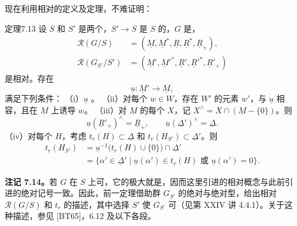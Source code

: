 现在利用相对的定义及定理，不难证明：
\begin{SGAresult}{定理}{7.13}
设 $S$ 和 $S'$ 是两个，$S'\to S$ 是 $S$ 的，$G$ 是，
\begin{align*}
 \mathscr R(G/S)&=(\underline M,\underline M^*,\underline R,\underline R^*,\underline R_+),\\
 \mathscr R(G_{S'}/S')&=(\underline M',\underline M'^*,\underline R',\underline R'^*,\underline R'_+)
\end{align*}
是相对。存在
\[
 \underline u:\underline M'\longrightarrow\underline M,
\]
满足下列条件：
（i）$\underline u$ 。
（ii）对每个 $w\in W$，存在 $W'$ 的元素 $w'$，与 $\underline u$ 相容，且在 $\underline M$ 上诱导 $w$。
（iii）对 $\underline M$ 的每个 $X$，记 $X^\wedge=X\cap(\underline M-\{0\})$。则
\[
 \underline u(\underline R'_+)^\wedge=\underline R_+,\qquad
 \underline u(\underline\Delta')^\wedge=\underline\Delta.
\]
（iv）对每个 $H$，考虑 $t_r(H)\subset\underline\Delta$ 和 $t_r(H_{S'})\subset\underline\Delta'$。则
\begin{align*}
 t_r(H_{S'})
 &=\underline u^{-1}\bigl(t_r(H)\cup\{0\}\bigr)\cap\underline\Delta'\\
 &=\{\alpha'\in\underline\Delta'\mid\underline u(\alpha')\in t_r(H)\text{ 或 }\underline u(\alpha')=0\}.
\end{align*}
\end{SGAresult}
\textbf{注记 7.14。}若 $G$ 在 $S$ 上可，它的极大就是，因而这里引进的相对概念与此前引进的绝对记号一致。因此，前一定理借助群 $G_{S'}$ 的绝对与绝对型，给出相对 $\mathscr R(G/S)$ 和 $t_r$ 的描述，其中选择 $S'$ 使 $G_{S'}$ 可（见第 XXIV 讲 4.4.1）。关于这种描述，参见 [BT65]，6.12 及以下各段。

